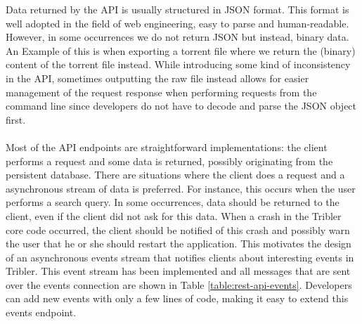 \noindent Data returned by the API is usually structured in JSON format. This format is well adopted in the field of web engineering, easy to parse and human-readable. However, in some occurrences we do not return JSON but instead, binary data. An Example of this is when exporting a torrent file where we return the (binary) content of the torrent file instead. While introducing some kind of inconsistency in the API, sometimes outputting the raw file instead allows for easier management of the request response when performing requests from the command line since developers do not have to decode and parse the JSON object first.\\\\
Most of the API endpoints are straightforward implementations: the client performs a request and some data is returned, possibly originating from the persistent database. There are situations where the client does a request and a asynchronous stream of data is preferred. For instance, this occurs when the user performs a search query. In some occurrences, data should be returned to the client, even if the client did not ask for this data. When a crash in the Tribler core code occurred, the client should be notified of this crash and possibly warn the user that he or she should restart the application. This motivates the design of an asynchronous events stream that notifies clients about interesting events in Tribler. This event stream has been implemented and all messages that are sent over the events connection are shown in Table \ref{table:rest-api-events}. Developers can add new events with only a few lines of code, making it easy to extend this events endpoint.\\

